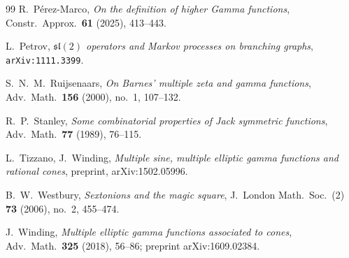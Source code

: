 \documentclass[11pt,letterpaper]{article}
\begin{document}
\begin{thebibliography}{99}
 R.~P\'erez-Marco,
\emph{On the definition of higher Gamma functions},
Constr.\ Approx.\ \textbf{61} (2025), 413--443.

 L.~Petrov,
\emph{$\mathfrak{sl}(2)$ operators and Markov processes on branching graphs},
\texttt{arXiv:1111.3399}.

 S.~N.~M.~Ruijsenaars,
\emph{On Barnes' multiple zeta and gamma functions},
Adv.\ Math.\ \textbf{156} (2000), no.~1, 107--132.

 R.~P.~Stanley,
\emph{Some combinatorial properties of Jack symmetric functions},
Adv.\ Math.\ \textbf{77} (1989), 76--115.

 L.~Tizzano, J.~Winding,
\emph{Multiple sine, multiple elliptic gamma functions and rational cones},
preprint, arXiv:1502.05996.

 B.~W.~Westbury,
\emph{Sextonions and the magic square},
J.\ London Math.\ Soc.\ (2) \textbf{73} (2006), no.~2, 455--474.

 J.~Winding,
\emph{Multiple elliptic gamma functions associated to cones},
Adv.\ Math.\ \textbf{325} (2018), 56--86; preprint arXiv:1609.02384.

\end{thebibliography}
\end{document}

